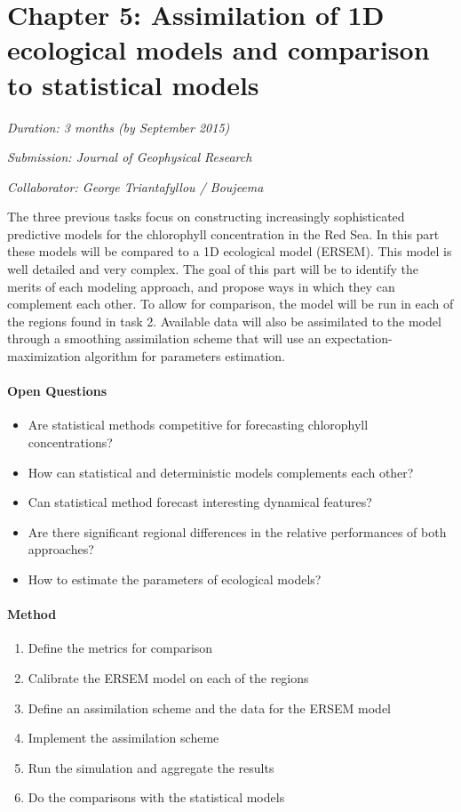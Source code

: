 \section{Chapter 5: Assimilation of 1D ecological models and comparison to statistical models}

\noindent
\emph{Duration: 3 months (by September 2015)}

\noindent
\emph{Submission: Journal of Geophysical Research}

\noindent
\emph{Collaborator: George Triantafyllou / Boujeema}

The three previous tasks focus on constructing increasingly sophisticated predictive models for the chlorophyll concentration in the Red Sea. In this part these models will be compared to a 1D ecological model (ERSEM). This model is well detailed and very complex. The goal of this part will be to identify the merits of each modeling approach, and propose ways in which they can complement each other. To allow for comparison, the model will be run in each of the regions found in task 2. Available data will also be assimilated to the model through a smoothing assimilation scheme that will use an expectation-maximization algorithm for parameters estimation. 

\paragraph{Open Questions}

\begin{itemize}
\item Are statistical methods competitive for forecasting chlorophyll concentrations?
\item How can statistical and deterministic models complements each other?
\item Can statistical method forecast interesting dynamical features?
\item Are there significant regional differences in the relative performances of both approaches?
\item How to estimate the parameters of ecological models? 
\end{itemize}

\paragraph{Method}

\begin{enumerate}
\item Define the metrics for comparison
\item Calibrate the ERSEM model on each of the regions
\item Define an assimilation scheme and the data for the ERSEM model
\item Implement the assimilation scheme
\item Run the simulation and aggregate the results
\item Do the comparisons with the statistical models
\end{enumerate}

